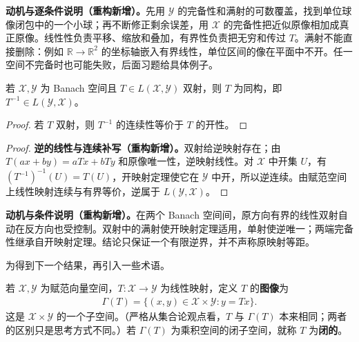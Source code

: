 \documentclass[../../main.tex]{subfiles}
\begin{document}
\begin{remark}
\textbf{动机与逐条件说明（重构新增）。}先用 $\mathcal Y$ 的完备性和满射的可数覆盖，找到单位球像闭包中的一个小球；再不断修正剩余误差，用 $\mathcal X$ 的完备性把近似原像相加成真正原像。线性性负责平移、缩放和叠加，有界性负责把无穷和传过 $T$。满射不能直接删除：例如 $\mathbb R\to\mathbb R^2$ 的坐标轴嵌入有界线性，单位区间的像在平面中不开。任一空间不完备时也可能失败，后面习题给具体例子。
\end{remark}
\begin{corollary}\label{corollary:ch05-bounded-inverse}
若 $\mathcal X,\mathcal Y$ 为 Banach 空间且 $T\in L(\mathcal X,\mathcal Y)$ 双射，则 $T$ 为同构，即 $T^{-1}\in L(\mathcal Y,\mathcal X)$。
\end{corollary}
\begin{proof}
若 $T$ 双射，则 $T^{-1}$ 的连续性等价于 $T$ 的开性。
\end{proof}
\begin{proof}
\textbf{逆的线性与连续补写（重构新增）。}双射给逆映射存在；由 $T(ax+by)=aTx+bTy$ 和原像唯一性，逆映射线性。对 $\mathcal X$ 中开集 $U$，有 $(T^{-1})^{-1}(U)=T(U)$，开映射定理使它在 $\mathcal Y$ 中开，所以逆连续。由赋范空间上线性映射连续与有界等价，逆属于 $L(\mathcal Y,\mathcal X)$。
\end{proof}
\begin{remark}
\textbf{动机与条件说明（重构新增）。}在两个 Banach 空间间，原方向有界的线性双射自动在反方向也受控制。双射中的满射使开映射定理适用，单射使逆唯一；两端完备性继承自开映射定理。结论只保证一个有限逆界，并不声称原映射等距。
\end{remark}
为得到下一个结果，再引入一些术语。
\begin{definition}[图像与闭线性映射]\label{definition:ch05-closed-graph}
若 $\mathcal X,\mathcal Y$ 为赋范向量空间，$T:\mathcal X\to\mathcal Y$ 为线性映射，定义 $T$ 的\textbf{图像}为
\begin{align*}
\Gamma(T)=\{(x,y)\in\mathcal X\times\mathcal Y:y=Tx\}.
\end{align*}
这是 $\mathcal X\times\mathcal Y$ 的一个子空间。（严格从集合论观点看，$T$ 与 $\Gamma(T)$ 本来相同；两者的区别只是思考方式不同。）若 $\Gamma(T)$ 为乘积空间的闭子空间，就称 $T$ 为\textbf{闭的}。
\end{definition}
\end{document}
